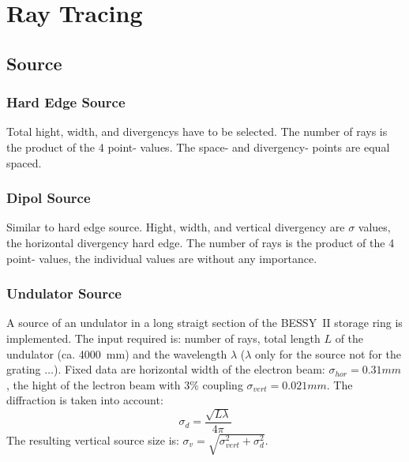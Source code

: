 



\chapter{Ray Tracing}   

\section{Source}
\subsection{Hard Edge Source} 
Total hight, width, and divergencys have to be selected. The number of rays is
the product of the 4 point- values.  The space- and divergency- points are
equal spaced.

\subsection{Dipol Source} 
Similar to hard edge source. Hight, width, and vertical divergency are $\sigma$
values, the horizontal divergency hard edge. The number of rays is
the product of the 4 point- values, the individual values are without any
importance.

\subsection{Undulator Source} 

A source of an undulator in a long straigt section of the
BESSY~II storage ring is implemented. The input required is: number of rays,
total length $L$ of the undulator (ca. 4000~mm) and the wavelength $ \lambda$
($\lambda$ only for the source not for the grating $\ldots$). 
Fixed data are  
horizontal width of the electron beam: $\sigma_{hor} = 0.31 mm$, the hight of 
the lectron beam with 3\% coupling $\sigma_{vert} = 0.021 mm$. The diffraction 
is taken into account:
\[ \sigma_d = \frac{\sqrt{L \lambda}}{4\pi} \] 
The resulting vertical source size is: 
$\sigma_{v}=\sqrt{\sigma_{vert}^2+\sigma_d^2}$.

